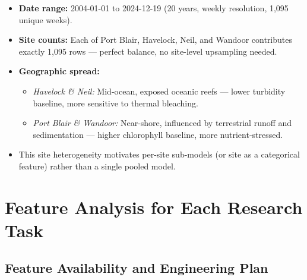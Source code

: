 \documentclass[12pt,a4paper]{report}
\begin{document}
\begin{itemize}[leftmargin=*]
  \item \textbf{Date range:} 2004-01-01 to 2024-12-19 (20 years, weekly resolution,
    1,095 unique weeks).
  \item \textbf{Site counts:} Each of Port Blair, Havelock, Neil, and Wandoor contributes
    exactly 1,095 rows — perfect balance, no site-level upsampling needed.
  \item \textbf{Geographic spread:}
    \begin{itemize}
      \item \textit{Havelock \& Neil:} Mid-ocean, exposed oceanic reefs — lower
        turbidity baseline, more sensitive to thermal bleaching.
      \item \textit{Port Blair \& Wandoor:} Near-shore, influenced by terrestrial
        runoff and sedimentation — higher chlorophyll baseline, more nutrient-stressed.
    \end{itemize}
  \item This site heterogeneity motivates per-site sub-models (or site as a
    categorical feature) rather than a single pooled model.
\end{itemize}

\chapter{Feature Analysis for Each Research Task}

\section{Feature Availability and Engineering Plan}
\end{document}
